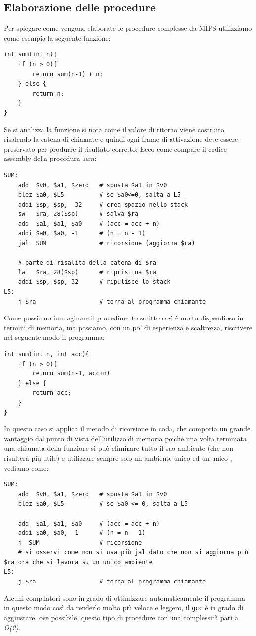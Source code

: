 \documentclass[class=book, crop=false, oneside]{standalone}
\begin{document}
\subsection{Elaborazione delle procedure}
Per spiegare come vengono elaborate le procedure complesse da MIPS utilizziamo come esempio la seguente funzione:

\begin{verbatim}
int sum(int n){
	if (n > 0){
		return sum(n-1) + n;
	} else {
		return n;
	}
}
\end{verbatim}

Se si analizza la funzione si nota come il valore di ritorno viene costruito risalendo la catena di chiamate e quindi ogni frame di attivazione deve essere preservato per produrre il risultato corretto. Ecco come compare il codice assembly della procedura \emph{sum}:

\begin{verbatim}
SUM:
	add  $v0, $a1, $zero   # sposta $a1 in $v0
	blez $a0, $L5          # se $a0<=0, salta a L5
	addi $sp, $sp, -32     # crea spazio nello stack
	sw   $ra, 28($sp)      # salva $ra
	add  $a1, $a1, $a0     # (acc = acc + n)
	addi $a0, $a0, -1      # (n = n - 1)
	jal  SUM               # ricorsione (aggiorna $ra)

	# parte di risalita della catena di $ra
	lw   $ra, 28($sp)      # ripristina $ra
	addi $sp, $sp, 32      # ripulisce lo stack
L5:
	j $ra                  # torna al programma chiamante
\end{verbatim}

Come possiamo immaginare il procedimento scritto così è  molto dispendioso in termini di memoria, ma possiamo, con un po' di esperienza e scaltrezza, riscrivere nel seguente modo il programma:

\begin{verbatim}
int sum(int n, int acc){
	if (n > 0){
		return sum(n-1, acc+n)
	} else {
		return acc;
	}
}
\end{verbatim}

In questo caso si applica il metodo di ricorsione in coda, che comporta un grande vantaggio dal punto di vista dell'utilizzo di memoria poiché una volta terminata una chiamata della funzione si può eliminare tutto il suo ambiente (che non risulterà più utile) e utilizzare sempre solo un ambiente unico ed un unico , vediamo come:

\begin{verbatim}
SUM:
	add  $v0, $a1, $zero   # sposta $a1 in $v0
	blez $a0, $L5          # se $a0 <= 0, salta a L5

	add  $a1, $a1, $a0     # (acc = acc + n)
	addi $a0, $a0, -1      # (n = n - 1)
	j  SUM                 # ricorsione
	# si osservi come non si usa più jal dato che non si aggiorna più $ra ora che si lavora su un unico ambiente
L5:
	j $ra                  # torna al programma chiamante
\end{verbatim}
Alcuni compilatori sono in grado di ottimizzare automaticamente il programma in questo modo così da renderlo molto più veloce e leggero, il \texttt{gcc} è in grado di aggiustare, ove possibile, questo tipo di procedure con una complessità pari a \emph{O(2)}.
\end{document}
